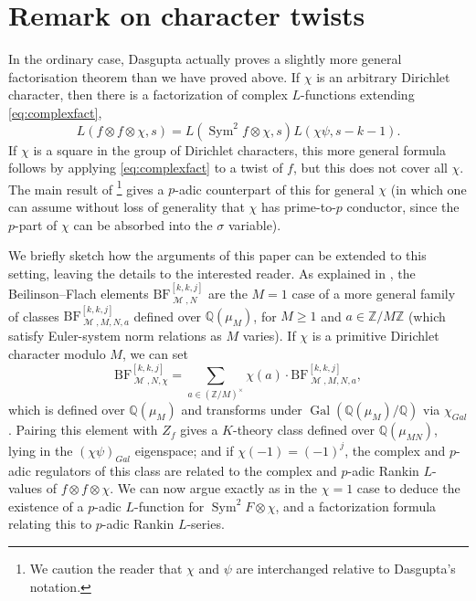 \documentclass[11pt, a4paper, reqno]{amsart}
\theoremstyle{definition}
\theoremstyle{plain}
\theoremstyle{remark}
\DeclareMathOperator{\Sym}{Sym}
\DeclareMathOperator{\mot}{\mathscr{M}}
\newcommand{\numberset}{\mathbb}
\newcommand{\Q}{\numberset{Q}}
\newcommand{\Z}{\numberset{Z}}
\newcommand{\BF}{\mathrm{BF}}
\renewcommand{\ge}{\geqslant}
\begin{document}
 \section{Remark on character twists}
 
  In the ordinary case, Dasgupta actually proves a slightly more general factorisation theorem than we have proved above. If $\chi$ is an arbitrary Dirichlet character, then there is a factorization of complex $L$-functions extending \eqref{eq:complexfact}, 
  \[ L(f \otimes f \otimes \chi, s) = L(\Sym^2 f \otimes \chi, s) L(\chi \psi, s - k - 1). \]
  If $\chi$ is a square in the group of Dirichlet characters, this more general formula follows by applying \eqref{eq:complexfact} to a twist of $f$, but this does not cover all $\chi$. The main result of \cite{Dasgupta-factorization}\footnote{We caution the reader that $\chi$ and $\psi$ are interchanged relative to Dasgupta's notation.} gives a $p$-adic counterpart of this for general $\chi$ (in which one can assume without loss of generality that $\chi$ has prime-to-$p$ conductor, since the $p$-part of $\chi$ can be absorbed into the $\sigma$ variable). 
    
  We briefly sketch how the arguments of this paper can be extended to this setting, leaving the details to the interested reader. As explained in \cite{KLZ17}, the Beilinson--Flach elements $\BF_{\mot, N}^{[k, k, j]}$ are the $M = 1$ case of a more general family of classes $\BF_{\mot, M, N, a}^{[k, k, j]}$ defined over $\Q(\mu_M)$, for $M \ge 1$ and $a \in \Z / M\Z$ (which satisfy Euler-system norm relations as $M$ varies). If $\chi$ is a primitive Dirichlet character modulo $M$, we can set
  \[ \BF_{\mot, N, \chi}^{[k, k, j]} = \sum_{a \in (\Z / M)^\times} \chi(a) \cdot \BF_{\mot, M, N, a}^{[k, k, j]}, \]
  which is defined over $\Q(\mu_M)$ and transforms under $\operatorname{Gal}(\Q(\mu_M) / \Q)$ via $\chi_{Gal}$. Pairing this element with $Z_f$ gives a $K$-theory class defined over $\Q(\mu_{MN})$, lying in the $(\chi \psi)_{Gal}$ eigenspace; and if $\chi(-1) = (-1)^j$, the complex and $p$-adic regulators of this class are related to the complex and $p$-adic Rankin $L$-values of $f \otimes f \otimes \chi$. We can now argue exactly as in the $\chi = 1$ case to deduce the existence of a $p$-adic $L$-function for $\Sym^2 F \otimes \chi$, and a factorization formula relating this to $p$-adic Rankin $L$-series. 
  
  
  
\end{document}

